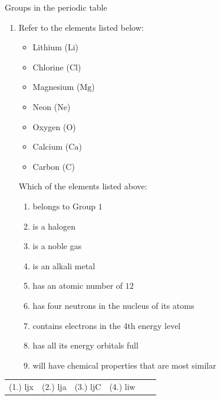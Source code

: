 \begin{exercises}{Groups in the periodic table}
\begin{enumerate}[noitemsep, label=\textbf{\arabic*}. ]
\item            \label{m38760*id262476}Refer to the elements listed below: \label{m38760*id7632}\begin{itemize}[noitemsep]
            \item Lithium ($\mathrm{Li}$)\item Chlorine ($\mathrm{Cl}$)\item Magnesium ($\mathrm{Mg}$)\item Neon ($\mathrm{Ne}$)\item Oxygen ($\mathrm{O}$)\item Calcium ($\mathrm{Ca}$)\item Carbon ($\mathrm{C}$)\end{itemize}
         Which of the elements listed above:
        \label{m38760*id262499}\begin{enumerate}[noitemsep, label=\textbf{\alph*}. ] 
            \label{m38760*uid158}\item belongs to Group $1$
\label{m38760*uid159}\item is a halogen
\label{m38760*uid160}\item is a noble gas
\label{m38760*uid161}\item is an alkali metal
\label{m38760*uid162}\item has an atomic number of $12$
\label{m38760*uid163}\item has four neutrons in the nucleus of its atoms
\label{m38760*uid164}\item contains electrons in the 4th energy level
\label{m38760*uid166}\item has all its energy orbitals full
\label{m38760*uid167}\item will have chemical properties that are most similar
\end{enumerate}
\end{enumerate}
         \par 
\label{m38760**end}
\practiceinfo
\par 
 \par \begin{tabular}[h]{cccccc}
 (1.) ljx  & (2.) lja & (3.) ljC & (4.) liw \end{tabular}

\end{exercises}
